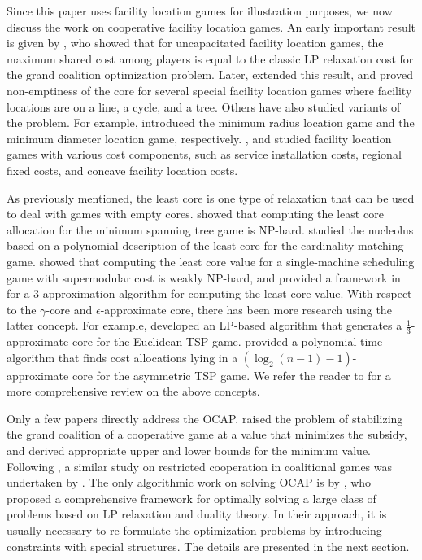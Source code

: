 \documentclass[ijoc,nonblindrev]{informs3} %
\begin{document}
Since this paper uses facility location games for illustration purposes, we now discuss the work on  cooperative facility location games.  An early important result is given by \cite{Kolen1983FacilityLocationGame}, who showed that for uncapacitated facility location games, the maximum shared cost among players is equal to the classic LP relaxation cost for the grand coalition optimization problem. 
Later, \cite{Goemans2000FacilityLocationGames} extended this result, and proved non-emptiness of the core for several special facility location games where facility locations are on a line, a cycle, and a tree.
Others have also studied variants of the problem. For example, \cite{Puerto2011,Puerto2012} introduced the minimum radius location game and the minimum diameter location game, respectively.
\cite{Xu2009}, \cite{Mallozzi2011} and \cite{Li2012UFLPConcave}  studied  facility location games with various cost components, such as service installation costs, regional fixed costs, and concave facility location costs.


As previously mentioned, the least core  is one type of relaxation that can be used to deal with games with empty cores.  \cite{faigle2000note} showed that computing the least core allocation for the minimum spanning tree game is NP-hard. \cite{Kern2003} studied the nucleolus based on a polynomial description of the least core for the cardinality matching game. \cite{Uhan2010} showed that computing the least core value for a single-machine scheduling game with supermodular cost is weakly NP-hard, and provided a framework in \cite{Uhan2013LeastCore} for a 3-approximation algorithm for computing the least core value.
With respect to  the $\gamma$-core and $\epsilon$-approximate core, there has been more research using the latter concept.  For example, \cite{Faigle1998EuclideanTSPGamesCore} developed an LP-based algorithm that generates a $\frac{1}{3}$-approximate core for the Euclidean TSP game. \cite{Blaser2008MetricTSPGamesCore} provided a polynomial time algorithm that finds cost allocations lying in a $(\log_2(n-1)-1)$-approximate core for the asymmetric TSP game.
We refer the reader to \cite{Jain2007CostSharing} for a more comprehensive review on the above concepts.


Only a few papers directly address the OCAP. 
\cite{Bachrach2009Cost} raised the problem of stabilizing the grand coalition of a cooperative game at  a value that minimizes the subsidy, and derived appropriate upper and lower bounds for the minimum value.
Following \cite{Bachrach2009Cost}, a similar study on restricted cooperation in coalitional games was undertaken by \cite{Meir2011subsidies}. The only algorithmic  work on solving OCAP is by
\cite{Caprara2010LPB}, who proposed a comprehensive framework for optimally solving a large class of problems  based on LP relaxation and duality theory.  
In their approach, it is usually necessary to re-formulate the optimization problems by introducing constraints with special structures. The details are presented in the next section.
\end{document}
